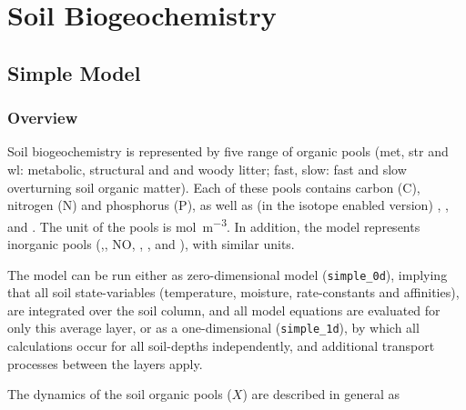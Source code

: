 \chapter{Soil Biogeochemistry}\label{ch:soil_biogeochemistry}

\section{Simple Model}\label{sec:sb:simple_model}

\subsection{Overview}\label{sec:sb:simple_overview}

Soil biogeochemistry is represented by five range of organic pools (met, str and wl: metabolic, structural and and woody litter; fast, slow: fast and slow overturning soil organic matter). Each of these pools contains carbon (C), nitrogen (N) and phosphorus (P), as well as (in the isotope enabled version) , , and . The unit of the pools is \unit{mol m^{-3}}. In addition, the model represents inorganic pools (,, NO, , , and ), with similar units. 

The model can be run either as zero-dimensional model (\texttt{simple\_0d}), implying that all soil state-variables (temperature, moisture, rate-constants and affinities), are integrated over the soil column, and all model equations are evaluated for only this average layer, or as a one-dimensional (\texttt{simple\_1d}), by which all calculations occur for all soil-depths independently, and additional transport processes between the layers apply.

The dynamics of the soil organic pools ($X$) are described in general as 

